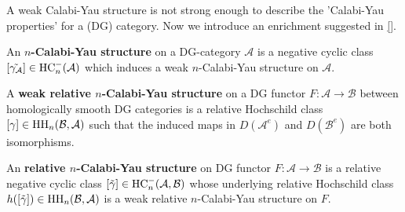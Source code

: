 A weak Calabi-Yau structure is not strong enough to describe the 'Calabi-Yau properties' for a (DG) category. Now we introduce an enrichment suggested in \ref{}.
\begin{mydefn}
	An \textbf{$n$-Calabi-Yau structure} on a DG-category $\mathcal{A}$ is a negative cyclic class $[\tilde{\gamma_{\mathcal{A}}}] \in \text{HC}_n^{-}(\mathcal{A})$ which induces a weak $n$-Calabi-Yau structure on $\mathcal{A}$.
\end{mydefn}  

\begin{mydefn}
A \textbf{weak relative $n$-Calabi-Yau structure} on a DG functor $F: \mathcal{A} \rightarrow \mathcal{B}$ between homologically smooth DG categories is a relative Hochschild class $[\gamma] \in \text{HH}_n(\mathcal{B}, \mathcal{A})$ such that the induced maps in $D(\mathcal{A}^{e})$ and $D(\mathcal{B}^e)$ are both isomorphisms.
\end{mydefn}

\begin{mydefn}
An \textbf{relative $n$-Calabi-Yau structure} on DG functor $F: \mathcal{A} \rightarrow \mathcal{B}$ is a relative negative cyclic class $[\tilde{\gamma}] \in \text{HC}^{-}_n(\mathcal{A}, \mathcal{B})$ whose underlying relative Hochschild class $h([\tilde{\gamma}]) \in \text{HH}_n(\mathcal{B}, \mathcal{A})$ is a weak relative $n$-Calabi-Yau structure on $F$.
\end{mydefn}